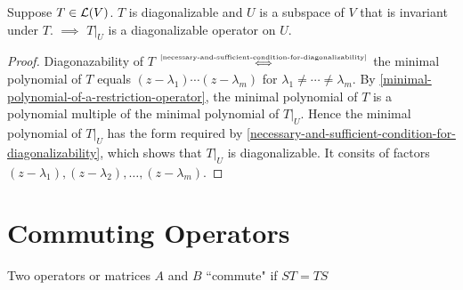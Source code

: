\setcounter{thm}{64}
\begin{thm}
  \label{restriction-ofdiagonalizable-operator-to-invariant-subspace}
  Suppose $T\in \mathcal{L}(V)$. $T$ is diagonalizable and $U$ is a subspace of $V$ that is invariant under $T$. $\implies$ $\left.T\right|_U$ is a diagonalizable operator on $U$.
\end{thm}
\begin{proof}
  Diagonazability of $T$ $\mathsmaller{\overset{\text{\ref{necessary-and-sufficient-condition-for-diagonalizability}}}{\iff}}$ the minimal polynomial of $T$ equals $(z-\lambda_1)\cdots(z-\lambda_m)$ for $\lambda_1 \neq \cdots \neq \lambda_m$. By \ref{minimal-polynomial-of-a-restriction-operator}, the minimal polynomial of $T$ is a polynomial multiple of the minimal polynomial of $\left.T\right|_U$. Hence the minimal polynomial of $\left.T\right|_U$  has the form required by \ref{necessary-and-sufficient-condition-for-diagonalizability}, which shows that $\left.T\right|_U$ is diagonalizable. It consits of factors $(z-\lambda_1),(z-\lambda_2), \dots, (z-\lambda_m)$.
\end{proof}


\section{Commuting Operators}
\begin{mydef}
  Two operators or matrices $A$ and $B$ ``commute" if $ST=TS$
\end{mydef}